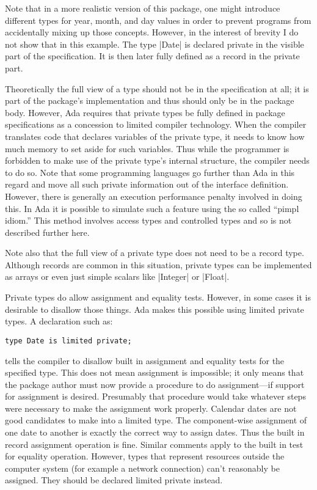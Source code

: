 Note that in a more realistic version of this package, one might introduce different types for
year, month, and day values in order to prevent programs from accidentally mixing up those
concepts. However, in the interest of brevity I do not show that in this example. The type
|Date| is declared private in the visible part of the specification. It is then later fully
defined as a record in the private part.

Theoretically the full view of a type should not be in the specification at all; it is part of
the package's implementation and thus should only be in the package body. However, Ada requires
that private types be fully defined in package specifications as a concession to limited
compiler technology. When the compiler translates code that declares variables of the private
type, it needs to know how much memory to set aside for such variables. Thus while the
programmer is forbidden to make use of the private type's internal structure, the compiler needs
to do so. Note that some programming languages go further than Ada in this regard and move all
such private information out of the interface definition. However, there is generally an
execution performance penalty involved in doing this. In Ada it is possible to simulate such a
feature using the so called ``pimpl idiom.'' This method involves access types and controlled
types and so is not described further here.

Note also that the full view of a private type does not need to be a record type. Although
records are common in this situation, private types can be implemented as arrays or even just
simple scalars like |Integer| or |Float|.

Private types do allow assignment and equality tests. However, in some cases it is desirable to
disallow those things. Ada makes this possible using limited private types. A declaration such
as:

\begin{lstlisting}
type Date is limited private;
\end{lstlisting}

\noindent tells the compiler to disallow built in assignment and equality tests for the
specified type. This does not mean assignment is impossible; it only means that the package
author must now provide a procedure to do assignment---if support for assignment is desired.
Presumably that procedure would take whatever steps were necessary to make the assignment work
properly. Calendar dates are not good candidates to make into a limited type. The component-wise
assignment of one date to another is exactly the correct way to assign dates. Thus the built in
record assignment operation is fine. Similar comments apply to the built in test for equality
operation. However, types that represent resources outside the computer system (for example a
network connection) can't reasonably be assigned. They should be declared limited private
instead.

